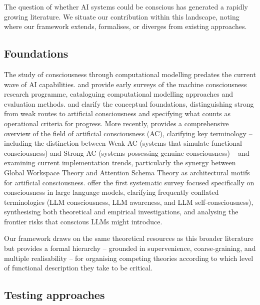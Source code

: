 \documentclass[11pt, a4paper, onecolumn, gdm]{google}
\begin{document}
The question of whether AI systems could be conscious has generated a rapidly growing literature.
We situate our contribution within this landscape, noting where our framework extends, formalises, or diverges from existing approaches.

\subsection{Foundations}\label{foundations}

The study of consciousness through computational modelling predates the current wave of AI capabilities.
\citet{gamez2008} and \citet{reggia2013} provide early surveys of the machine consciousness research programme, cataloguing computational modelling approaches and evaluation methods.
\citet{chrisley2008} and \citet{clowes2008} clarify the conceptual foundations, distinguishing strong from weak routes to artificial consciousness and specifying what counts as operational criteria for progress.
More recently, \citet{elamrani2025} provides a comprehensive overview of the field of artificial consciousness (AC), clarifying key terminology -- including the distinction between Weak AC (systems that simulate functional consciousness) and Strong AC (systems possessing genuine consciousness) -- and examining current implementation trends, particularly the synergy between Global Workspace Theory and Attention Schema Theory as architectural motifs for artificial consciousness.
\citet{chen2025a} offer the first systematic survey focused specifically on consciousness in large language models, clarifying frequently conflated terminologies (LLM consciousness, LLM awareness, and LLM self-consciousness), synthesising both theoretical and empirical investigations, and analysing the frontier risks that conscious LLMs might introduce.

Our framework draws on the same theoretical resources as this broader literature but provides a formal hierarchy -- grounded in supervenience, coarse-graining, and multiple realisability -- for organising competing theories according to which level of functional description they take to be critical.

\subsection{Testing approaches}\label{testing-approaches}
\end{document}
